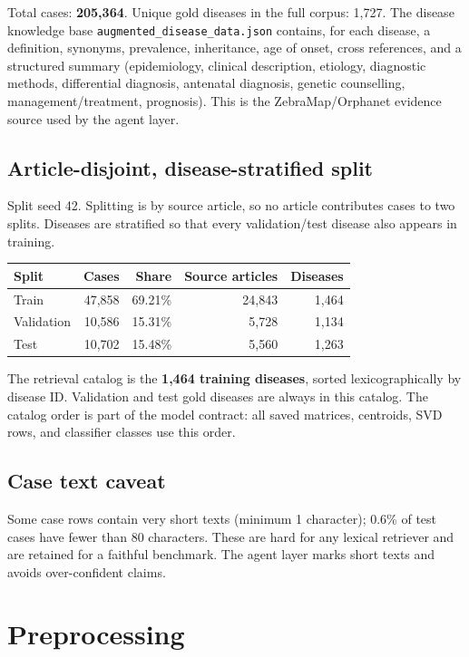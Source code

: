 \documentclass[11pt,a4paper]{article}
\newcommand{\code}[1]{\texttt{\small #1}}
\begin{document}
Total cases: \textbf{205,364}. Unique gold diseases in the full corpus: 1,727.
The disease knowledge base \code{augmented\_disease\_data.json} contains, for each
disease, a definition, synonyms, prevalence, inheritance, age of onset, cross
references, and a structured summary (epidemiology, clinical description,
etiology, diagnostic methods, differential diagnosis, antenatal diagnosis, genetic
counselling, management/treatment, prognosis). This is the ZebraMap/Orphanet
evidence source used by the agent layer.

\subsection{Article-disjoint, disease-stratified split}

Split seed 42. Splitting is by source article, so no article contributes cases to
two splits. Diseases are stratified so that every validation/test disease also
appears in training.

\begin{center}
\begin{tabular}{lrrrr}
\toprule
Split & Cases & Share & Source articles & Diseases\\
\midrule
Train & 47,858 & 69.21\% & 24,843 & 1,464\\
Validation & 10,586 & 15.31\% & 5,728 & 1,134\\
Test & 10,702 & 15.48\% & 5,560 & 1,263\\
\bottomrule
\end{tabular}
\end{center}

The retrieval catalog is the \textbf{1,464 training diseases}, sorted
lexicographically by disease ID. Validation and test gold diseases are always in
this catalog. The catalog order is part of the model contract: all saved matrices,
centroids, SVD rows, and classifier classes use this order.

\subsection{Case text caveat}

Some case rows contain very short texts (minimum 1 character); 0.6\% of test cases
have fewer than 80 characters. These are hard for any lexical retriever and are
retained for a faithful benchmark. The agent layer marks short texts and avoids
over-confident claims.

\section{Preprocessing}
\end{document}

